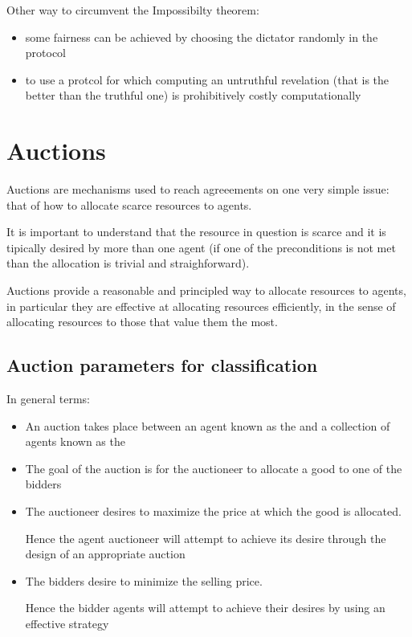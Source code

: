 Other way to circumvent the Impossibilty theorem:
\begin{itemize}
\item some fairness can be achieved by choosing the dictator randomly in the protocol
\item to use a protcol for which computing an untruthful revelation (that is the better than the truthful one) is prohibitively costly computationally
\end{itemize}

\section{Auctions}
Auctions are mechanisms used to reach agreeements on one very simple issue: that of how to allocate scarce resources to agents.

It is important to understand that the resource in question is scarce and it is tipically desired by more than one agent (if one of the preconditions is not met than the allocation is trivial and straighforward).

Auctions provide a reasonable and principled way to allocate resources to agents, in particular they are effective at allocating resources efficiently, in the sense of allocating resources to those that value them the most.
\subsection{Auction parameters for classification}
In general terms:
\begin{itemize}
\item An auction takes place between an agent known as the  and a collection of agents known as the 
\item The goal of the auction is for the auctioneer to allocate a good to one of the bidders
\item The auctioneer desires to maximize the price at which the good is allocated.

Hence the agent auctioneer will attempt to achieve its desire through the design of an appropriate auction
\item The bidders desire to minimize the selling price.

Hence the bidder agents will attempt to achieve their desires by using an effective strategy
\end{itemize}

